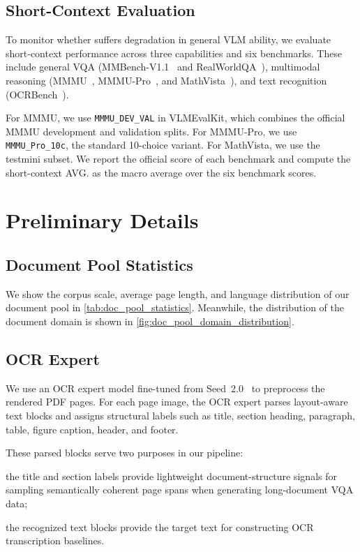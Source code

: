 {{\subsection{Short-Context Evaluation}
\label{app:evaluation_details:short_context}
To monitor whether \modelname suffers degradation in general VLM ability, we evaluate short-context performance across three capabilities and six benchmarks.
These include general VQA (MMBench-V1.1~\citep{liu2024mmbench} and RealWorldQA~\citep{grok15}), multimodal reasoning (MMMU~\citep{yue2024mmmu}, MMMU-Pro~\citep{yue2025mmmupro}, and MathVista~\citep{lu2023mathvista}), and text recognition (OCRBench~\citep{liu2024ocrbench}).

For MMMU, we use \texttt{MMMU\_DEV\_VAL} in VLMEvalKit, which combines the official MMMU development and validation splits.
For MMMU-Pro, we use \texttt{MMMU\_Pro\_10c}, the standard 10-choice variant.
For MathVista, we use the testmini subset.
We report the official score of each benchmark and compute the short-context AVG. as the macro average over the six benchmark scores.

\section{Preliminary Details}
\subsection{Document Pool Statistics}
\label{app:document_pool_stats}
We show the corpus scale, average page length, and language distribution of our document pool in \cref{tab:doc_pool_statistics}.
Meanwhile, the distribution of the document domain is shown in \cref{fig:doc_pool_domain_distribution}.

\subsection{OCR Expert}
We use an OCR expert model fine-tuned from Seed~2.0~\citep{seed2_0} to preprocess the rendered PDF pages.
For each page image, the OCR expert parses layout-aware text blocks and assigns structural labels such as title, section heading, paragraph, table, figure caption, header, and footer.

These parsed blocks serve two purposes in our pipeline:
\begin{inparaenum}[(i)]
\item the title and section labels provide lightweight document-structure signals for sampling semantically coherent page spans when generating long-document VQA data;
\item the recognized text blocks provide the target text for constructing OCR transcription baselines.
\end{inparaenum}

}}
